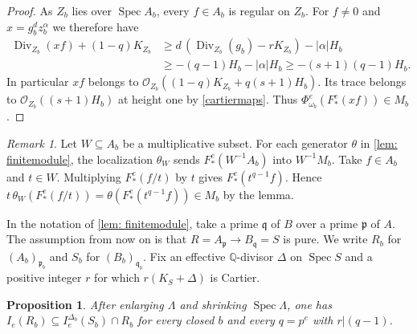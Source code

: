 \documentclass[11pt,leqno]{amsart}
\numberwithin{equation}{section}
\newtheorem{proposition}[theorem]{Proposition}
\theoremstyle{definition}
\theoremstyle{remark}
\newtheorem{remark}[theorem]{Remark}
\renewcommand{\O}{\mathcal{O}}
\newcommand{\Q}{\mathbb{Q}}
\newcommand{\Spec}{\operatorname{Spec}}
\newcommand{\Div}{\operatorname{Div}}
\begin{document}
\begin{proof}
As $Z_b$ lies over $\Spec A_b$, every $f\in A_b$ is regular on $Z_b$. For $f\ne0$ and $x=g_b^d z_b^\alpha$ we therefore have
\begin{align*}
 \Div_{Z_b}(xf)+(1-q)K_{Z_b}
 &\geq d\,(\Div_{Z_b}(g_b)-r K_{Z_b})-|\alpha|H_b\\
 &\geq -(q-1)H_b-|\alpha|H_b
 \geq -(s+1)(q-1)H_b.
\end{align*}
In particular $xf$ belongs to $\O_{Z_b}((1-q)K_{Z_b}+q(s+1)H_b)$. Its trace belongs to $\O_{Z_b}((s+1)H_b)$ at height one by \cref{cartiermaps}. Thus $\Phi^e_{\omega_b}(F^e_*(xf))\in M_b$.
\end{proof}


\begin{remark}\label{rem:localization}
Let $W\subseteq A_b$ be a multiplicative subset. For each generator $\theta$ in \cref{lem: finitemodule}, the localization $\theta_W$ sends $F^e_*(W^{-1}A_b)$ into $W^{-1}M_b$.  Take $f\in A_b$ and $t\in W$. Multiplying $F^e_*(f/t)$ by $t$ gives $F^e_*(t^{q-1}f)$. Hence $t\,\theta_W(F^e_*(f/t))=\theta(F^e_*(t^{q-1}f))\in M_b$ by the lemma.
\end{remark}


In the notation of \cref{lem: finitemodule}, take a prime $\mathfrak q$ of $B$ over a prime $\mathfrak p$ of $A$. The assumption from now on is that $R=A_{\mathfrak p}\to B_{\mathfrak q}=S$ is pure. We write $R_b$ for $(A_b)_{\mathfrak p_b}$ and $S_b$ for $(B_b)_{\mathfrak q_b}$. Fix an effective $\Q$-divisor $\Delta$ on $\Spec S$ and a positive integer $r$ for which $r(K_S+\Delta)$ is Cartier.




\begin{proposition} \label{prop: splittingcomparison}
After enlarging $\Lambda$ and shrinking $\Spec\Lambda$, one has $I_e(R_b)\subseteq I_e^{\Delta_b}(S_b)\cap R_b$ for every closed $b$ and every $q=p^e$ with $r|(q-1)$.
\end{proposition}
\end{document}
